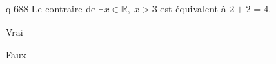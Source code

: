 \begin{truefalse}{q-688}
Le contraire de $\exists x \in \mathbb R,\: x>3$ est équivalent à $2+2=4$.
\item Vrai
\item* Faux
\end{truefalse}

